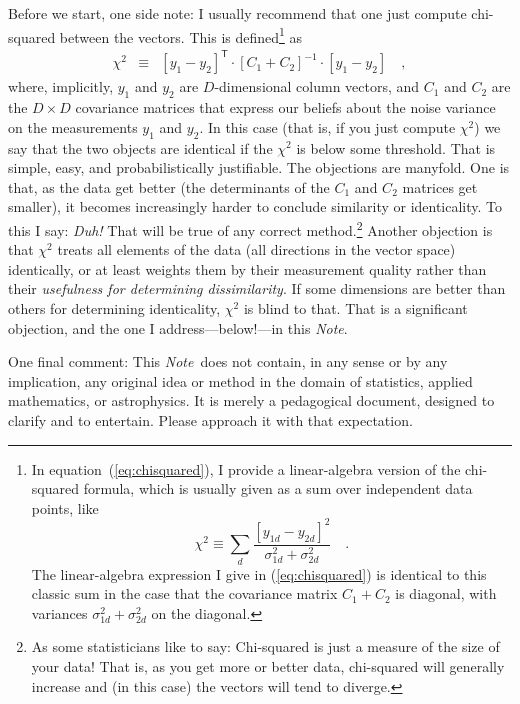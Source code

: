 \documentclass[12pt,letterpaper]{article}
\newcommand{\documentname}{\textsl{Note}}
\newcommand{\equationname}{equation}
\newcommand{\tra}[1]{{#1}^{\mathsf{T}}}
\newcommand{\inv}[1]{{#1}^{-1}}
\begin{document}
Before we start, one side note: I usually recommend that one just
compute chi-squared between the vectors. This is defined\footnote{In
  \equationname~(\ref{eq:chisquared}), I provide a linear-algebra
  version of the chi-squared formula, which is usually given as a sum
  over independent data points, like
  \[\chi^2\equiv\sum_d\frac{[y_{1d}-y_{2d}]^2}{\sigma_{1d}^2+\sigma_{2d}^2} \quad .\]
  The linear-algebra expression I give in (\ref{eq:chisquared}) is
  identical to this classic sum in the case that the covariance matrix
  $C_1 + C_2$ is diagonal, with variances $\sigma_{1d}^2+\sigma_{2d}^2$ on the
  diagonal.} as
\begin{eqnarray}
\chi^2 &\equiv&
\tra{[y_1 - y_2]}\cdot\inv{[C_1 + C_2]}\cdot [y_1 - y_2] \quad ,
\label{eq:chisquared}
\end{eqnarray}
where, implicitly, $y_1$ and $y_2$ are $D$-dimensional column vectors,
and $C_1$ and $C_2$ are the $D\times D$ covariance matrices that
express our beliefs about the noise variance on the measurements $y_1$
and $y_2$. In this case (that is, if you just compute $\chi^2$) we say
that the two objects are identical if the $\chi^2$ is below some
threshold. That is simple, easy, and probabilistically
justifiable. The objections are manyfold. One is that, as the data get
better (the determinants of the $C_1$ and $C_2$ matrices get smaller),
it becomes increasingly harder to conclude similarity or
identicality. To this I say: \emph{Duh!} That will be true of any
correct method.\footnote{%
  As some statisticians like to say: Chi-squared is just a measure of
  the size of your data! That is, as you get more or better data,
  chi-squared will generally increase and (in this case) the vectors will
  tend to diverge.}
Another objection is that $\chi^2$ treats all elements
of the data (all directions in the vector space) identically, or at
least weights them by their measurement quality rather than their
\emph{usefulness for determining dissimilarity}. If some dimensions
are better than others for determining identicality, $\chi^2$ is blind
to that. That is a significant objection, and the one I
address---below!---in this \documentname.

One final comment: This \documentname\ does not contain,
in any sense or by any implication, any original idea or method in the
domain of statistics, applied mathematics, or astrophysics. It is
merely a pedagogical document, designed to clarify and to entertain.
Please approach it with that expectation.
\end{document}
